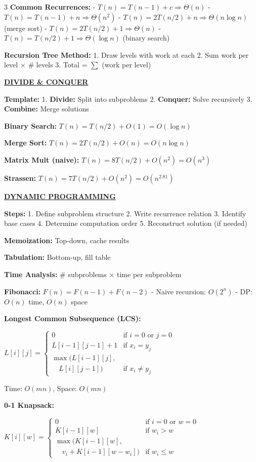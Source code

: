 \documentclass[7pt,landscape]{article}
\newcommand{\sect}[1]{\vspace{1mm}\textbf{\underline{#1}}\vspace{0.5mm}}
\begin{document}
\begin{multicols}{3}
\textbf{Common Recurrences:}
- $T(n) = T(n-1) + c \Rightarrow \Theta(n)$
- $T(n) = T(n-1) + n \Rightarrow \Theta(n^2)$
- $T(n) = 2T(n/2) + n \Rightarrow \Theta(n\log n)$ (merge sort)
- $T(n) = 2T(n/2) + 1 \Rightarrow \Theta(n)$
- $T(n) = T(n/2) + 1 \Rightarrow \Theta(\log n)$ (binary search)

\textbf{Recursion Tree Method:}
1. Draw levels with work at each
2. Sum work per level $\times$ \# levels
3. Total = $\sum$ (work per level)

\sect{DIVIDE \& CONQUER}

\textbf{Template:}
1. \textbf{Divide:} Split into subproblems
2. \textbf{Conquer:} Solve recursively
3. \textbf{Combine:} Merge solutions

\textbf{Binary Search:} $T(n) = T(n/2) + O(1) = O(\log n)$

\textbf{Merge Sort:} $T(n) = 2T(n/2) + O(n) = O(n\log n)$

\textbf{Matrix Mult (naive):} $T(n) = 8T(n/2) + O(n^2) = O(n^3)$

\textbf{Strassen:} $T(n) = 7T(n/2) + O(n^2) = O(n^{2.81})$

\sect{DYNAMIC PROGRAMMING}

\textbf{Steps:}
1. Define subproblem structure
2. Write recurrence relation
3. Identify base cases
4. Determine computation order
5. Reconstruct solution (if needed)

\textbf{Memoization:} Top-down, cache results

\textbf{Tabulation:} Bottom-up, fill table

\textbf{Time Analysis:} \# subproblems $\times$ time per subproblem

\textbf{Fibonacci:} $F(n) = F(n-1) + F(n-2)$
- Naive recursion: $O(2^n)$
- DP: $O(n)$ time, $O(n)$ space

\textbf{Longest Common Subsequence (LCS):}

$L[i][j] = \begin{cases} 
0 & \text{if } i=0 \text{ or } j=0 \\ 
L[i-1][j-1]+1 & \text{if } x_i = y_j \\ 
\max(L[i-1][j], & \\
\quad L[i][j-1]) & \text{if } x_i \neq y_j 
\end{cases}$

Time: $O(mn)$, Space: $O(mn)$

\textbf{0-1 Knapsack:}

$K[i][w] = \begin{cases} 
0 & \text{if } i=0 \text{ or } w=0 \\ 
K[i-1][w] & \text{if } w_i > w \\ 
\max(K[i-1][w], & \\
\quad v_i + K[i-1][w-w_i]) & \text{if } w_i \leq w 
\end{cases}$


\end{multicols}
\end{document}
